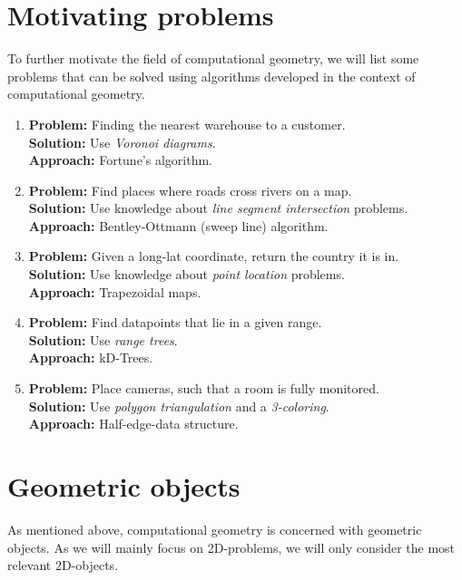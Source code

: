 \section{Motivating problems}
    To further motivate the field of computational geometry, we will list some problems that can be solved using algorithms developed in the context of computational geometry. 
    \begin{enumerate}
        \item \textbf{Problem:} Finding the nearest warehouse to a customer. \\
        \textbf{Solution:} Use \emph{Voronoi diagrams}. \\
        \textbf{Approach:} Fortune's algorithm.

        \item \textbf{Problem:} Find places where roads cross rivers on a map. \\
        \textbf{Solution:} Use knowledge about \emph{line segment intersection} problems. \\
        \textbf{Approach:} Bentley-Ottmann (sweep line) algorithm.

        \item \textbf{Problem:} Given a long-lat coordinate, return the country it is in. \\ 
        \textbf{Solution:} Use knowledge about \emph{point location} problems. \\
        \textbf{Approach:} Trapezoidal maps.

        \item \textbf{Problem:} Find datapoints that lie in a given range. \\
        \textbf{Solution:} Use \emph{range trees}. \\
        \textbf{Approach:} kD-Trees.

        \item \textbf{Problem:} Place cameras, such that a room is fully monitored. \\
        \textbf{Solution:} Use \emph{polygon triangulation} and a \emph{3-coloring}. \\
        \textbf{Approach:} Half-edge-data structure.
    \end{enumerate}

\section{Geometric objects}
    As mentioned above, computational geometry is concerned with geometric objects. As we will mainly focus on 2D-problems, we will only consider the most relevant 2D-objects.

